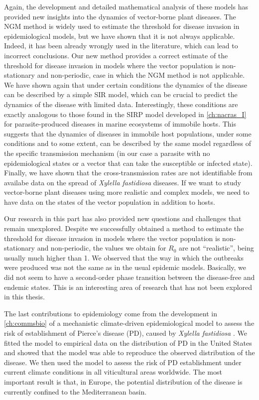 Again, the development and detailed mathematical analysis of these models has
provided new insights into the dynamics of vector-borne plant diseases. The NGM
method is widely used to estimate the threshold for disease invasion in
epidemiological models, but we have shown that it is not always applicable.
Indeed, it has been already wrongly used in the literature, which can lead to
incorrect conclusions. Our new method provides a correct estimate of the
threshold for disease invasion in models where the vector population is
non-stationary and non-periodic, case in which the NGM method is not
applicable. We have shown again that under certain conditions the dynamics of
the disease can be described by a simple SIR model, which can be crucial to
predict the dynamics of the disease with limited data. Interestingly, these
conditions are exactly analogous to those found in the SIRP model developed in
\cref{ch:nacras_I} for parasite-produced diseases in marine ecosystems of
immobile hosts. This suggests that the dynamics of diseases in immobile host
populations, under some conditions and to some extent, can be described by the
same model regardless of the specific transmission mechanism (in our case a
parasite with no epidemiological states or a vector that can take the
susceptible or infected state). Finally, we have shown that the
cross-transmission rates are not identifiable from availabe data on the spread
of \textit{Xylella fastidiosa} diseases. If we want to study vector-borne
plant diseases using more realistic and complex models, we need to have data
on the states of the vector population in addition to hosts.

Our research in this part has also provided new questions and challenges that
remain unexplored. Despite we successfully obtained a method to estimate the
threshold for disease invasion in models where the vector population is
non-stationary and non-periodic, the values we obtain for $R_0$ are not
``realistic'', being usually much higher than 1. We observed that the way in
which the outbreaks were produced was not the same as in the usual epidemic
models. Basically, we did not seem to have a second-order phase transition
between the disease-free and endemic states. This is an interesting area of
research that has not been explored in this thesis.

The last contributions to epidemiology come from the development in
\cref{ch:commsbio} of a mechanistic climate-driven epidemiological model to
assess the risk of establishment of Pierce's disease (PD), caused by
\textit{Xylella fastidiosa} \cite{GimenezRomero2022_CommsBio}. We fitted the
model to empirical data on the distribution of PD in the United States and
showed that the model was able to reproduce the observed distribution of the
disease. We then used the model to assess the risk of PD establishment under
current climate conditions in all viticultural areas worldwide. The most
important result is that, in Europe, the potential distribution of the disease
is currently confined to the Mediterranean basin.


